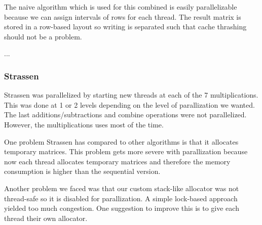 The naive algorithm which is used for this combined is easily parallelizable because we can assign intervals of rows for each thread. The result matrix is stored in a row-based layout so writing is separated such that cache thrashing should not be a problem.

...


\subsubsection{Strassen}

Strassen was parallelized by starting new threads at each of the 7 multiplications. This was done at 1 or 2 levels depending on the level of parallization we wanted. The last additions/subtractions and combine operations were not parallelized. However, the multiplications uses most of the time.

One problem Strassen has compared to other algorithms is that it allocates temporary matrices. This problem gets more severe with parallization because now each thread allocates temporary matrices and therefore the memory consumption is higher than the sequential version.

Another problem we faced was that our custom stack-like allocator was not thread-safe so it is disabled for parallization. A simple lock-based approach yielded too much congestion. One suggestion to improve this is to give each thread their own allocator.

